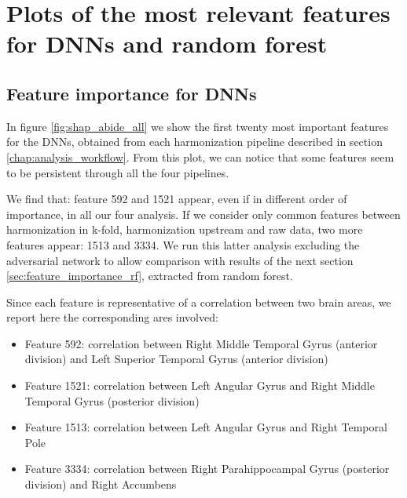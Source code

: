 \documentclass[11pt]{report}
\begin{document}
\newpage
\section{Plots of the most relevant features for DNNs and random forest}
\subsection{Feature importance for DNNs}\label{sec:feature_importance_dnn} 

In figure \ref{fig:shap_abide_all} we show the first twenty most important features for the DNNs, obtained from each harmonization pipeline described in section \ref{chap:analysis_workflow}.
From this plot, we can notice that some features seem to be persistent through all the four pipelines.


We find that: feature 592 and 1521 appear, even if in different order of importance, in all our four analysis.
If we consider only common features between harmonization in k-fold, harmonization upstream and raw data, two more features appear: 1513 and 3334.
We run this latter analysis excluding the adversarial network to allow comparison with results of the next section \ref{sec:feature_importance_rf}, extracted from random forest.

Since each feature is representative of a correlation between two brain areas, we report here the corresponding ares involved:
\begin{itemize}
\item Feature 592: correlation between Right Middle Temporal Gyrus (anterior division) and Left Superior Temporal Gyrus (anterior division)
\item Feature 1521: correlation between Left Angular Gyrus  and Right Middle Temporal Gyrus (posterior division)
\item Feature 1513: correlation between Left Angular Gyrus  and Right Temporal Pole
\item Feature 3334: correlation between Right Parahippocampal Gyrus (posterior division) and Right Accumbens

\end{itemize}
\end{document}
